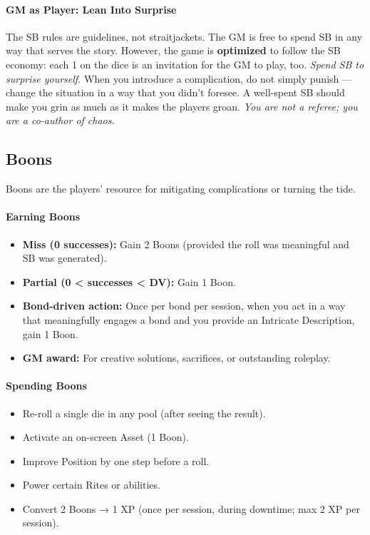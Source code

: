 \paragraph{GM as Player: Lean Into Surprise}
The SB rules are guidelines, not straitjackets. The GM is free to spend SB in any way that serves the story. However, the game is \textbf{optimized} to follow the SB economy: each 1 on the dice is an invitation for the GM to play, too. \textit{Spend SB to surprise yourself.} When you introduce a complication, do not simply punish — change the situation in a way that you didn't foresee. A well-spent SB should make you grin as much as it makes the players groan. \textit{You are not a referee; you are a co-author of chaos.}

\subsection{Boons}
Boons are the players' resource for mitigating complications or turning the tide.

\paragraph{Earning Boons}
\begin{itemize}
  \item \textbf{Miss (0 successes):} Gain 2 Boons (provided the roll was meaningful and SB was generated).
  \item \textbf{Partial (0 < successes < DV):} Gain 1 Boon.
  \item \textbf{Bond-driven action:} Once per bond per session, when you act in a way that meaningfully engages a bond and you provide an Intricate Description, gain 1 Boon.
  \item \textbf{GM award:} For creative solutions, sacrifices, or outstanding roleplay.
\end{itemize}

\paragraph{Spending Boons}
\begin{itemize}
  \item Re-roll a single die in any pool (after seeing the result).
  \item Activate an on-screen Asset (1 Boon).
  \item Improve Position by one step before a roll.
  \item Power certain Rites or abilities.
  \item Convert 2 Boons → 1 XP (once per session, during downtime; max 2 XP per session).
\end{itemize}


